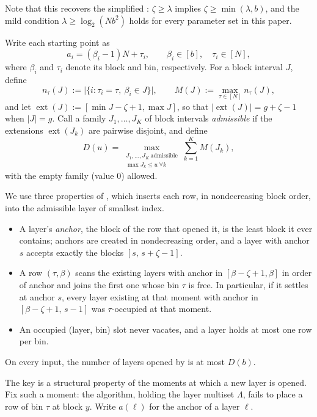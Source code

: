 Note that this recovers the simplified : $\zeta \ge \lambda$ implies $\zeta \ge \min(\lambda, b)$, and the mild condition $\lambda \ge \log_2(Nb^2)$ holds for every parameter set in this paper.

Write each starting point as
\[
  a_i=(\beta_i-1)N+\tau_i,
  \qquad
  \beta_i\in[b],\quad \tau_i\in[N],
\]
where $\beta_i$ and $\tau_i$ denote its block and bin, respectively. For
a block interval $J$, define
\[
  n_\tau(J) := \bigl|\{i:\tau_i=\tau,\ \beta_i\in J\}\bigr|,
  \qquad
  M(J):=\max_{\tau\in[N]}n_\tau(J),
\]
and let $\operatorname{ext}(J) := [\min J-\zeta+1,\max J]$, so that
$|\operatorname{ext}(J)|=g+\zeta-1$ when $|J|=g$. Call a family
$J_1,\ldots,J_K$ of block intervals \emph{admissible} if the extensions
$\operatorname{ext}(J_k)$ are pairwise disjoint, and define
\[
    D(u)  =  \max_{\substack{J_1,\ldots,J_K\ \mathrm{admissible}\\
    \max J_k\le u\ \forall k}} \sum_{k=1}^{K} M(J_k),
\]
with the empty family (value $0$) allowed.

We use three properties of , which inserts each
row, in nondecreasing block order, into the admissible layer of smallest
index.
\begin{itemize}
  \item[(P1)] A layer's \emph{anchor}, the block of the row that opened
        it, is the least block it ever contains; anchors are created in
        nondecreasing order, and a layer with anchor $s$ accepts exactly
        the blocks $[s,\, s+\zeta-1]$.
  \item[(P2)] A row $(\tau,\beta)$ scans the existing layers with anchor
        in $[\beta-\zeta+1,\beta]$ in order of anchor and joins the
        first one whose bin $\tau$ is free. In particular, if it settles
        at anchor $s$, every layer existing at that moment with anchor
        in $[\beta-\zeta+1,\, s-1]$ was $\tau$-occupied at that moment.
  \item[(P3)] An occupied (layer, bin) slot never vacates, and a layer
        holds at most one row per bin.
\end{itemize}

\begin{proposition}\label{prop:det-Lprime}
On every input, the number of layers opened by  is
at most $D(b)$.
\end{proposition}

The key is a structural property of the moments at which a new layer is
opened. Fix such a moment: the algorithm, holding the layer multiset
$\Lambda$, fails to place a row of bin $\tau$ at block $y$. Write
$a(\ell)$ for the anchor of a layer $\ell$.

